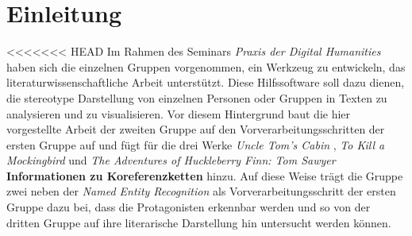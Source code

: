 \documentclass[a4paper,12pt,titlepage=true, ngerman]{scrartcl}
\begin{document}



\newpage

\listoffigures



\newpage

\listoftables


\newpage
{}

\section{Einleitung}\label{Einleitung} %
 
<<<<<<< HEAD
Im Rahmen des Seminars \emph{Praxis der Digital Humanities} haben sich die einzelnen Gruppen vorgenommen, ein Werkzeug zu entwickeln, das literaturwissenschaftliche Arbeit unterstützt. Diese Hilfssoftware soll dazu dienen, die stereotype Darstellung von einzelnen Personen oder Gruppen in Texten zu analysieren und zu visualisieren. Vor diesem Hintergrund baut die hier vorgestellte Arbeit der zweiten Gruppe auf den Vorverarbeitungsschritten der ersten Gruppe auf und fügt für die drei Werke \emph{Uncle Tom's Cabin}  \autocite[]{chris_uncle}, \emph{To Kill a Mockingbird}  \autocite[]{chris_bird} und \emph{The Adventures of Huckleberry Finn: Tom Sawyer} \autocite[]{chris_adventures} \textbf{Informationen zu Koreferenzketten} hinzu. Auf diese Weise trägt die Gruppe zwei neben der \emph{Named Entity Recognition} als Vorverarbeitungsschritt der ersten Gruppe dazu bei, dass die Protagonisten erkennbar werden und so von der dritten Gruppe auf ihre literarische Darstellung hin untersucht werden können.
\end{document}
